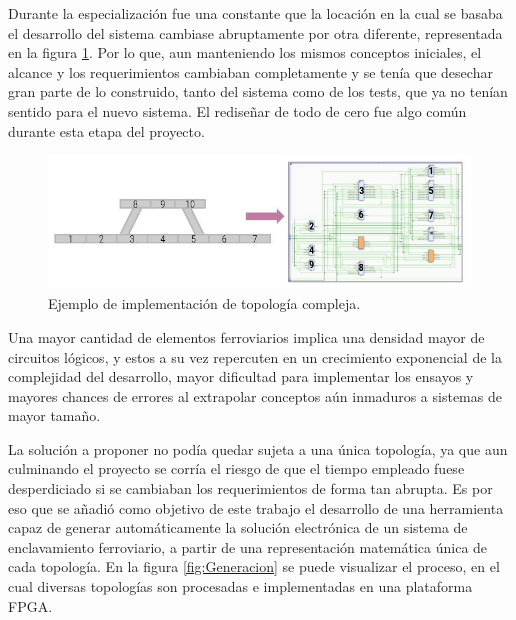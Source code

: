 		\vspace{5cm}
		
		
		
		Durante la especialización fue una constante que la locación en la cual se basaba el desarrollo del sistema cambiase abruptamente por otra diferente, representada en la figura \ref{fig:CESE_2}. Por lo que, aun manteniendo los mismos conceptos iniciales, el alcance y los requerimientos cambiaban completamente y se tenía que desechar gran parte de lo construido, tanto del sistema como de los tests, que ya no tenían sentido para el nuevo sistema. El rediseñar de todo de cero fue algo común durante esta etapa del proyecto.
		
		\begin{figure}[htbp!]
			\centering
			\includegraphics[scale=.5]{./Figures/Grafo_VHDL_B}
			\caption{Ejemplo de implementación de topología compleja.}
			\label{fig:CESE_2}
		\end{figure}
			
		Una mayor cantidad de elementos ferroviarios implica una densidad mayor de circuitos lógicos, y estos a su vez repercuten en un crecimiento exponencial de la complejidad del desarrollo, mayor dificultad para implementar los ensayos y mayores chances de errores al extrapolar conceptos aún inmaduros a sistemas de mayor tamaño.
		
		La solución a proponer no podía quedar sujeta a una única topología, ya que aun culminando el proyecto se corría el riesgo de que el tiempo empleado fuese desperdiciado si se cambiaban los requerimientos de forma tan abrupta. Es por eso que se añadió como objetivo de este trabajo el desarrollo de una herramienta capaz de generar automáticamente la solución electrónica de un sistema de enclavamiento ferroviario, a partir de una representación matemática única de cada topología. En la figura \ref{fig:Generacion} se puede visualizar el proceso, en el cual diversas topologías son procesadas e implementadas en una plataforma FPGA.
		
